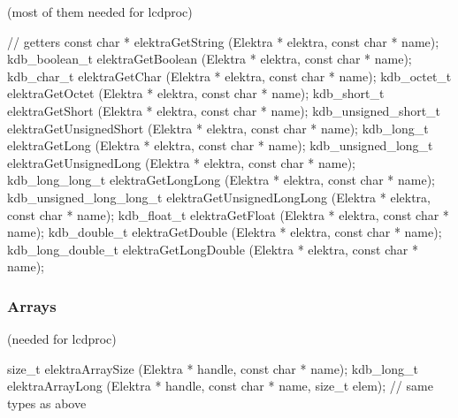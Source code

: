 (most of them needed for lcdproc)


\begin{DoxyCode}
\textcolor{comment}{// getters}
\textcolor{keyword}{const} \textcolor{keywordtype}{char} * elektraGetString (Elektra * elektra, \textcolor{keyword}{const} \textcolor{keywordtype}{char} * name);
kdb\_boolean\_t elektraGetBoolean (Elektra * elektra, \textcolor{keyword}{const} \textcolor{keywordtype}{char} * name);
kdb\_char\_t elektraGetChar (Elektra * elektra, \textcolor{keyword}{const} \textcolor{keywordtype}{char} * name);
kdb\_octet\_t elektraGetOctet (Elektra * elektra, \textcolor{keyword}{const} \textcolor{keywordtype}{char} * name);
kdb\_short\_t elektraGetShort (Elektra * elektra, \textcolor{keyword}{const} \textcolor{keywordtype}{char} * name);
kdb\_unsigned\_short\_t elektraGetUnsignedShort (Elektra * elektra, \textcolor{keyword}{const} \textcolor{keywordtype}{char} * name);
kdb\_long\_t elektraGetLong (Elektra * elektra, \textcolor{keyword}{const} \textcolor{keywordtype}{char} * name);
kdb\_unsigned\_long\_t elektraGetUnsignedLong (Elektra * elektra, \textcolor{keyword}{const} \textcolor{keywordtype}{char} * name);
kdb\_long\_long\_t elektraGetLongLong (Elektra * elektra, \textcolor{keyword}{const} \textcolor{keywordtype}{char} * name);
kdb\_unsigned\_long\_long\_t elektraGetUnsignedLongLong (Elektra * elektra, \textcolor{keyword}{const} \textcolor{keywordtype}{char} * name);
kdb\_float\_t elektraGetFloat (Elektra * elektra, \textcolor{keyword}{const} \textcolor{keywordtype}{char} * name);
kdb\_double\_t elektraGetDouble (Elektra * elektra, \textcolor{keyword}{const} \textcolor{keywordtype}{char} * name);
kdb\_long\_double\_t elektraGetLongDouble (Elektra * elektra, \textcolor{keyword}{const} \textcolor{keywordtype}{char} * name);
\end{DoxyCode}


\subsubsection*{Arrays}

(needed for lcdproc)


\begin{DoxyCode}
\textcolor{keywordtype}{size\_t} elektraArraySize (Elektra * handle, \textcolor{keyword}{const} \textcolor{keywordtype}{char} * name);
kdb\_long\_t elektraArrayLong (Elektra * handle, \textcolor{keyword}{const} \textcolor{keywordtype}{char} * name, \textcolor{keywordtype}{size\_t} elem);
\textcolor{comment}{// same types as above}
\end{DoxyCode}


